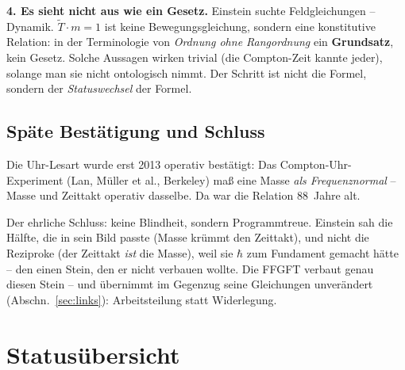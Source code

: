 \textbf{4. Es sieht nicht aus wie ein Gesetz.} Einstein suchte
Feldgleichungen -- Dynamik. $\tilde T \cdot m = 1$ ist keine
Bewegungsgleichung, sondern eine konstitutive Relation: in der
Terminologie von \emph{Ordnung ohne Rangordnung} ein
\textbf{Grundsatz}, kein Gesetz. Solche Aussagen wirken trivial
(die Compton-Zeit kannte jeder), solange man sie nicht ontologisch
nimmt. Der Schritt ist nicht die Formel, sondern der
\emph{Statuswechsel} der Formel.

\section{Späte Bestätigung und Schluss}

Die Uhr-Lesart wurde erst 2013 operativ bestätigt: Das
Compton-Uhr-Experiment (Lan, Müller et al., Berkeley) maß eine
Masse \emph{als Frequenznormal} -- Masse und Zeittakt operativ
dasselbe. Da war die Relation 88~Jahre alt.

Der ehrliche Schluss: keine Blindheit, sondern Programmtreue.
Einstein sah die Hälfte, die in sein Bild passte (Masse krümmt den
Zeittakt), und nicht die Reziproke (der Zeittakt \emph{ist} die
Masse), weil sie $\hbar$ zum Fundament gemacht hätte -- den einen
Stein, den er nicht verbauen wollte. Die FFGFT verbaut genau diesen
Stein -- und übernimmt im Gegenzug seine Gleichungen unverändert
(Abschn.~\ref{sec:links}): Arbeitsteilung statt Widerlegung.

\chapter{Statusübersicht}

